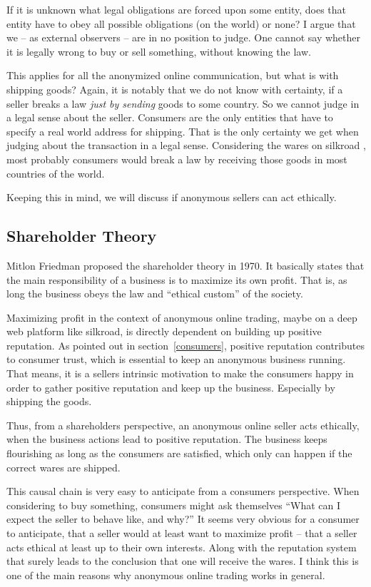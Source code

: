 If it is unknown what legal obligations are forced upon some entity, does that entity have to obey all possible obligations (on the world) or none? I argue that we -- as external observers -- are in no position to judge. One cannot say whether it is legally wrong to buy or sell something, without knowing the law.

This applies for all the anonymized online communication, but what is with shipping goods? Again, it is notably that we do not know with certainty, if a seller breaks a law \emph{just by sending} goods to some country. So we cannot judge in a legal sense about the seller. Consumers are the only entities that have to specify a real world address for shipping. That is the only certainty we get when judging about the transaction in a legal sense. Considering the wares on silkroad \cite{silkroad2013}, most probably consumers would break a law by receiving those goods in most countries of the world.

Keeping this in mind, we will discuss if anonymous sellers can act ethically.

\subsection{Shareholder Theory}

Mitlon Friedman proposed the shareholder theory in 1970. It basically states that the main responsibility of a business is to maximize its own profit. That is, as long the business obeys the law and ``ethical custom'' of the society\cite{shareholder}. 

Maximizing profit in the context of anonymous online trading, maybe on a deep web platform like silkroad, is directly dependent on building up positive reputation. As pointed out in section~\ref{consumers}, positive reputation contributes to consumer trust, which is essential to keep an anonymous business running. That means, it is a sellers intrinsic motivation to make the consumers happy in order to gather positive reputation and keep up the business. Especially by shipping the goods.

Thus, from a shareholders perspective, an anonymous online seller acts ethically, when the business actions lead to positive reputation. The business keeps flourishing as long as the consumers are satisfied, which only can happen if the correct wares are shipped.

This causal chain is very easy to anticipate from a consumers perspective. When considering to buy something, consumers might ask themselves ``What can I expect the seller to behave like, and why?'' It seems very obvious for a consumer to anticipate, that a seller would at least want to maximize profit -- that a seller acts ethical at least up to their own interests. Along with the reputation system that surely leads to the conclusion that one will receive the wares. I think this is one of the main reasons why anonymous online trading works in general.

